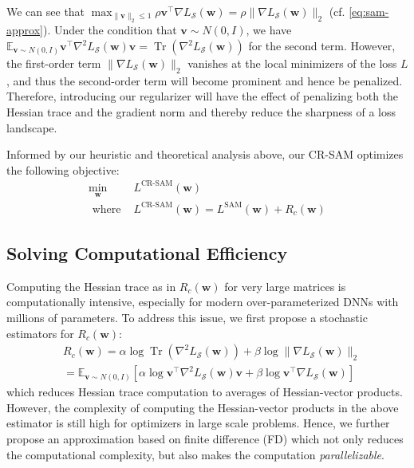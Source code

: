 \documentclass[letterpaper]{article} %
\theoremstyle{plain}
\theoremstyle{definition}
\begin{document}
We can see that $\max _{\|\boldsymbol{v}\|_2 \leq 1} \rho \boldsymbol{v}^{\top}\nabla L_{\mathcal{S}}(\boldsymbol{w})=\rho\|\nabla L_{\mathcal{S}}(\boldsymbol{w})\|_2$ %
(cf. \eqref{eq:sam-approx}). Under the condition that $\boldsymbol{v} \sim N(0, I)$, we have $\mathbb{E}_{\boldsymbol{v} \sim N(0, I)} \boldsymbol{v}^{\top} \nabla^2 L_{\mathcal{S}}(\boldsymbol{w}) \boldsymbol{v} = \operatorname{Tr}\left(\nabla^2 L_{\mathcal{S}}\left(\boldsymbol{w}\right)\right)$ for the second term. However, the first-order term $\|\nabla L_{\mathcal{S}}(\boldsymbol{w})\|_2$ vanishes at the local minimizers of the loss $L$, and thus the second-order term will become prominent and hence be penalized. Therefore, introducing our regularizer will have the effect of penalizing both the Hessian trace and the gradient norm and thereby reduce the sharpness of a loss landscape.

Informed by our heuristic and theoretical analysis above, our CR-SAM optimizes the following objective:
\begin{align}
\min _{\boldsymbol{w}} &L^{\operatorname{CR-SAM}}(\boldsymbol{w}) \nonumber \\
\text { where } & L^{\operatorname{CR-SAM}}(\boldsymbol{w}) = L^{\operatorname{SAM}}(\boldsymbol{w}) + R_c(\boldsymbol{w})
\end{align}

\subsection{Solving Computational Efficiency}
\label{subsec:fd}

Computing the Hessian trace as in $R_c(\boldsymbol{w})$ for very large matrices is computationally intensive, especially for modern over-parameterized DNNs with millions of parameters. To address this issue, we first propose a stochastic estimators for $R_c(\boldsymbol{w})$:
\begin{equation*}
\begin{split}
    &R_c(\boldsymbol{w}) = \alpha \log \operatorname{Tr}\left(\nabla^2 L_{\mathcal{S}}\left(\boldsymbol{w}\right)\right) + \beta \log \|\nabla L_{\mathcal{S}}(\boldsymbol{w})\|_2 \\
    &= \mathbb{E}_{\boldsymbol{v} \sim N(0, I)} \left[\alpha \log \boldsymbol{v}^{\top} \nabla^2 L_{\mathcal{S}}(\boldsymbol{w}) \boldsymbol{v}+ \beta \log \boldsymbol{v}^{\top} \nabla L_{\mathcal{S}}(\boldsymbol{w})\right]
\end{split}
\end{equation*}
which reduces Hessian trace computation to averages of Hessian-vector products. However, the complexity of computing the Hessian-vector products in the above estimator is still high for optimizers in large scale problems. Hence, we further propose an approximation based on finite difference (FD) which not only reduces the computational complexity, but also makes the computation \emph{parallelizable}.
\end{document}

